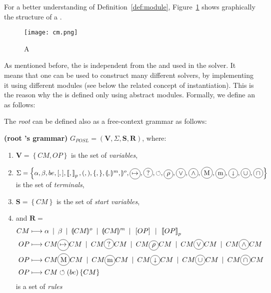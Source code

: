 For a better understanding of Definition~\ref{def:module}, Figure~\ref{fig:cm} shows graphically  the structure of a \cm.

\begin{figure}[h]
	\centering
	\texttt{[image: cm.png]}
	\caption[]{A \cm}
	\label{fig:cm}
\end{figure}

As mentioned before, the \as{} is independent from the \oms{} and \opchs{} used in the solver. It means that one \as{} can be used to construct many different solvers, by implementing it using different modules (see below the related concept of \as{} instantiation). This is the reason why the \as{} is defined only using {abstract} modules. Formally, we define an \as{} as follows:


The \textit{root} \cm{} can be defined also as a free-context grammar as follows:

\begin{definition}{\bf (root \cm{}'s grammar)}
\label{def:grammar}
$G_{POSL} = \left(\mathbf{V},\Sigma, \mathbf{S}, \mathbf{R}\right)$, where:
\begin{enumerate}\renewcommand{\labelitemi}{\scriptsize$\blacksquare$}
	\item $\mathbf{V} = \left\{CM, OP\right\}$ is the set of {\it variables},
	\item $\Sigma = \left\{\alpha, \beta, be, [, ], \lbk, \rbk_p, (, ), \{, \}, \llparenthesis, \rrparenthesis^m, \rrparenthesis^o, \circled{$\mapsto$},\circled{?},\circlearrowleft, \circled{$\rho$}, \circled{$\vee$}, \circled{$\wedge$}, \circled{M}, \circled{m}, \circled{$\shortdownarrow$}, \circled{$\cup$}, \circled{$\cap$}\right\}$ is the set of {\it terminals},
	\item $\mathbf{S} = \left\{CM\right\}$ is the set of {\it start variables},
	\item and $\mathbf{R} = $
		\begin{align*} 
		CM &\longmapsto \alpha \OR \beta \OR \llparenthesis CM \rrparenthesis^o \OR \llparenthesis CM \rrparenthesis^m \OR \left[OP\right] \OR \lbk OP\rbk_p \\
		OP &\longmapsto CM \circled{$\mapsto$} CM \OR CM \circled{?} CM \OR CM \circled{$\rho$} CM \OR CM \circled{$\vee$} CM \OR CM \circled{$\wedge$} CM\\
		OP &\longmapsto CM \circled{M} CM \OR CM \circled{m} CM \OR CM \circled{$\shortdownarrow$} CM \OR CM \circled{$\cup$} CM \OR CM \circled{$\cap$} CM \\
		OP &\longmapsto CM \circlearrowleft (be) \left\{CM\right\}		
		\end{align*} is a set of {\it rules}
\end{enumerate} 
\end{definition}


